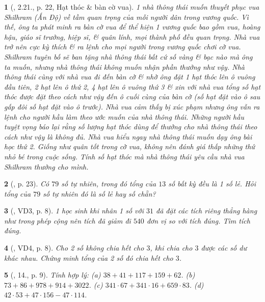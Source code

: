 \documentclass{article}
\newtheorem{baitoan}{}
\begin{document}
\begin{baitoan}[\cite{Binh_boi_duong_Toan_6_tap_1}, 2.21., p. 22, Hạt thóc \& bàn cờ vua]
	1 nhà thông thái muốn thuyết phục vua Shilhram (Ấn Độ) về tầm quan trọng của mỗi người dân trong vương quốc. Vì thế, ông ta phát minh ra bàn cờ vua để thể hiện 1 vương quốc bao gồm vua, hoàng hậu, giáo sĩ trưởng, hiệp sĩ, \& quân lính, mọi thành phố đều quan trọng. Nhà vua trở nên cực kỳ thích \& ra lệnh cho mọi người trong vương quốc chơi cờ vua. Shilhram tuyên bố sẽ ban tặng nhà thông thái bất cứ số vàng \& bạc nào mà ông ta muốn, nhưng nhà thông thái không muốn nhận phần thưởng như vậy. Nhà thông thái cùng với nhà vua đi đến bàn cờ \& nhờ ông đặt 1 hạt thóc lên ô vuông đầu tiên, 2 hạt lên ô thứ 2, 4 hạt lên ô vuông thứ 3 \& xin với nhà vua tổng số hạt thóc được đặt theo cách như vậy đến ô cuối cùng của bàn cờ (số hạt đặt vào ô sau gấp đôi số hạt đặt vào ô trước). Nhà vua cảm thấy bị xúc phạm nhưng ông vẫn ra lệnh cho người hầu làm theo ước muốn của nhà thông thái. Những người hầu tuyệt vọng báo lại rằng số lượng hạt thóc dùng để thưởng cho nhà thông thái theo cách như vậy là không đủ. Nhà vua hiểu ngay nhà thông thái muốn dạy ông bài học thứ 2. Giống như quân tốt trong cờ vua, không nên đánh giá thấp những thứ nhỏ bé trong cuộc sống. Tính số hạt thóc mà nhà thông thái yêu cầu nhà vua Shilhram thưởng cho mình.
\end{baitoan}

\begin{baitoan}[\cite{Binh_boi_duong_Toan_6_tap_1}, p. 23]
	Có $79$ số tự nhiên, trong đó tổng của $13$ số bất kỳ đều là 1 số lẻ. Hỏi tổng của $79$ số tự nhiên đó là số lẻ hay số chẵn?
\end{baitoan}

\begin{baitoan}[\cite{Tuyen_Toan_6}, VD3, p. 8]
	1 học sinh khi nhân 1 số với $31$ đã đặt các tích riêng thẳng hàng như trong phép cộng nên tích đã giảm đi $540$ đơn vị so với tích đúng. Tìm tích đúng.
\end{baitoan}

\begin{baitoan}[\cite{Tuyen_Toan_6}, VD4, p. 8]
	Cho 2 số không chia hết cho $3$, khi chia cho $3$ được các số dư khác nhau. Chứng minh tổng của 2 số đó chia hết cho $3$.
\end{baitoan}

\begin{baitoan}[\cite{Tuyen_Toan_6}, 14., p. 9]
	Tính hợp lý: (a) $38 + 41 + 117 + 159 + 62$. (b) $73 + 86 + 978 + 914 + 3022$. (c) $341\cdot67 + 341\cdot16 + 659\cdot83$. (d) $42\cdot53 + 47\cdot156 - 47\cdot114$.
\end{baitoan}
\end{document}
